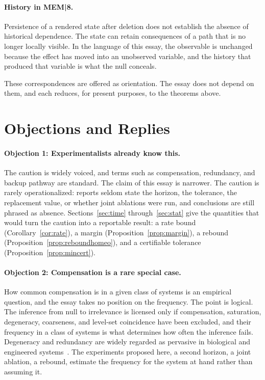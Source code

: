 \documentclass[11pt]{article}
\theoremstyle{definition}
\theoremstyle{remark}
\begin{document}
\paragraph{History in MEM|8.}
Persistence of a rendered state after deletion does not establish the absence of historical dependence. The state can retain consequences of a path that is no longer locally visible. In the language of this essay, the observable is unchanged because the effect has moved into an unobserved variable, and the history that produced that variable is what the null conceals.

These correspondences are offered as orientation. The essay does not depend on them, and each reduces, for present purposes, to the theorems above.

\section{Objections and Replies}\label{sec:objections}

\paragraph{Objection 1: Experimentalists already know this.}
The caution is widely voiced, and terms such as compensation, redundancy, and backup pathway are standard. The claim of this essay is narrower. The caution is rarely operationalized: reports seldom state the horizon, the tolerance, the replacement value, or whether joint ablations were run, and conclusions are still phrased as absence. Sections~\ref{sec:time} through~\ref{sec:stat} give the quantities that would turn the caution into a reportable result: a rate bound (Corollary~\ref{cor:rate}), a margin (Proposition~\ref{prop:margin}), a rebound (Proposition~\ref{prop:reboundhomeo}), and a certifiable tolerance (Proposition~\ref{prop:mincert}).

\paragraph{Objection 2: Compensation is a rare special case.}
How common compensation is in a given class of systems is an empirical question, and the essay takes no position on the frequency. The point is logical. The inference from null to irrelevance is licensed only if compensation, saturation, degeneracy, coarseness, and level-set coincidence have been excluded, and their frequency in a class of systems is what determines how often the inference fails. Degeneracy and redundancy are widely regarded as pervasive in biological and engineered systems~\cite{edelman2001}. The experiments proposed here, a second horizon, a joint ablation, a rebound, estimate the frequency for the system at hand rather than assuming it.
\end{document}
